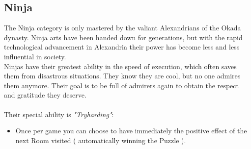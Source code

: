 \subsection{Ninja}


The Ninja category is only mastered by the valiant Alexandrians of the Okada dynasty. Ninja arts have been handed down for generations, but with the rapid technological advancement in Alexandria their power has become less and less influential in society. \\
Ninjas have their greatest ability in the speed of execution, which often saves them from disastrous situations. They know they are cool, but no one admires them anymore. Their goal is to be full of admirers again to obtain the respect and gratitude they deserve.\\\\
Their special ability is \textit{"Tryharding"}:
\begin{itemize}
\item Once per game you can choose to have immediately the positive effect of the next Room visited ( automatically winning the Puzzle ).
\end{itemize}


